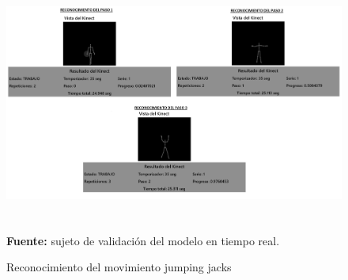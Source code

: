 \begin{figure}[H]
	\caption{Reconocimiento del movimiento jumping jacks}
	\label{fig:recognitionCheerleader}
	\centering
	\includegraphics[width=430px,height=320px]{graphics/resultados/recognitionCheerleader.png} \\
	\textbf{Fuente:} sujeto de validaci\'on del modelo en tiempo real.
\end{figure}
